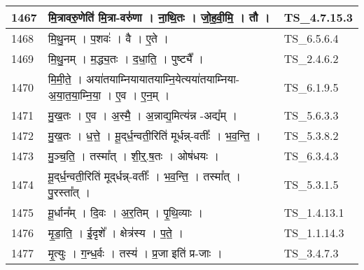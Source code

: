 \documentclass[17pt]{extarticle}
\begin{document}
\begin{longtable}{||p{0.4in}||p{4.9in}||p{0.9in}||}
    1467 & मि॒त्रावरु॒णेति॑ मि॒त्रा{-}वरु॑णा   ।   ना॒थि॒तः   ।   जो॒ह॒वी॒मि॒   ।   तौ   ।    & TS\_4.7.15.3       \\
    
    \hline
        
    1468 & मि॒थु॒नम्   ।   प॒शवः॑   ।   वै   ।   ए॒ते   ।    & TS\_6.5.6.4       \\
    
    \hline
        
    1469 & मि॒थु॒नम्   ।   म॒द्ध्य॒तः   ।   द॒धा॒ति॒   ।   पुष्ट्यै᳚   ।    & TS\_2.4.6.2       \\
    
    \hline
        
    1470 & मि॒मी॒ते॒   ।   अया॑तयाम्नियायातयाम्नि॒येत्यया॑तयाम्निया{-}अ॒या॒त॒या॒म्नि॒या॒   ।   ए॒व   ।   ए॒न॒म्   ।    & TS\_6.1.9.5       \\
    
    \hline
        
    1471 & मु॒ख॒तः   ।   ए॒व   ।   अ॒स्मै॒   ।   अ॒न्नाद्य॒मित्य॑न्न {-}अद्य᳚म्   ।    & TS\_5.6.3.3       \\
    
    \hline
        
    1472 & मु॒ख॒तः   ।   ध॒त्ते॒   ।   मू॒द्‌र्ध॒न्वती॒रिति॑ मूर्धन्न्{-}वतीः᳚   ।   भ॒व॒न्ति॒   ।    & TS\_5.3.8.2       \\
    
    \hline
        
    1473 & मु॒ञ्च॒ति॒   ।   तस्मा᳚त्   ।   शी॒र्॒.ष॒तः   ।   ओष॑धयः   ।    & TS\_6.3.4.3       \\
    
    \hline
        
    1474 & मू॒द्‌र्ध॒न्वती॒रिति॑ मूद्‌र्धन्न्{-}वतीः᳚   ।   भ॒व॒न्ति॒   ।   तस्मा᳚त्   ।   पु॒रस्ता᳚त्   ।    & TS\_5.3.1.5       \\
    
    \hline
        
    1475 & मू॒र्धान᳚म्   ।   दि॒वः   ।   अ॒र॒तिम्   ।   पृ॒थि॒व्याः   ।    & TS\_1.4.13.1       \\
    
    \hline
        
    1476 & मृ॒डा॒ति॒   ।   ई॒दृशे᳚   ।   क्षेत्र॑स्य   ।   प॒ते॒   ।    & TS\_1.1.14.3       \\
    
    \hline
        
    1477 & मृ॒त्युः   ।   ग॒न्ध॒र्वः   ।   तस्य॑   ।   प्र॒जा इति॑ प्र{-}जाः   ।    & TS\_3.4.7.3       \\
    

\end{longtable}
\end{document}
